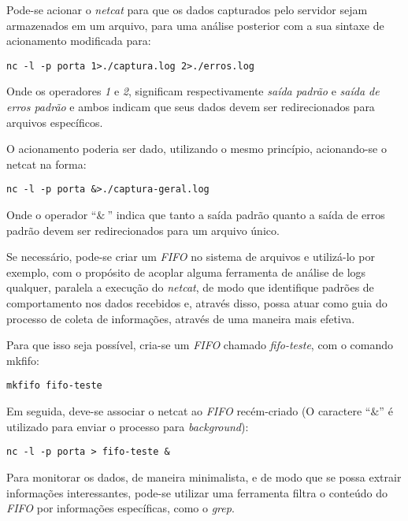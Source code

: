 Pode-se acionar o \textit{netcat} para que os dados capturados pelo servidor sejam armazenados em um arquivo, para uma análise posterior com a sua sintaxe de acionamento modificada para:

\scriptsize
\begin{verbatim}
nc -l -p porta 1>./captura.log 2>./erros.log
\end{verbatim}
\normalsize

Onde os operadores \textit{1} e \textit{2}, significam respectivamente \textit{saída padrão} e \textit{saída de erros padrão} e ambos indicam que seus dados devem ser redirecionados para arquivos específicos.

O acionamento poderia ser dado, utilizando o mesmo princípio, acionando-se o netcat na forma:

\scriptsize
\begin{verbatim}
nc -l -p porta &>./captura-geral.log
\end{verbatim}
\normalsize

Onde o operador ``$\&$$\>$'' indica que tanto a saída padrão quanto a saída de erros padrão devem ser redirecionados para um arquivo único.

Se necessário, pode-se criar um \textit{FIFO} no sistema de arquivos e utilizá-lo por exemplo, com o propósito de acoplar alguma ferramenta de análise de logs qualquer, paralela a execução do \textit{netcat}, de modo que identifique padrões de comportamento nos dados recebidos e, através disso, possa atuar como guia do processo de coleta de informações, através de uma maneira mais efetiva.

Para que isso seja possível, cria-se um \textit{FIFO} chamado \textit{fifo-teste}, com o comando mkfifo:

\scriptsize
\begin{verbatim}
mkfifo fifo-teste
\end{verbatim}
\normalsize

Em seguida, deve-se associar o netcat ao \textit{FIFO} recém-criado (O caractere ``$\&$'' é utilizado para enviar o processo para \textit{background}):

\scriptsize
\begin{verbatim}
nc -l -p porta > fifo-teste &
\end{verbatim}
\normalsize

Para monitorar os dados, de maneira minimalista, e de modo que se possa extrair informações interessantes, pode-se utilizar uma ferramenta filtra o conteúdo do \textit{FIFO} por informações específicas, como o \textit{grep}.


